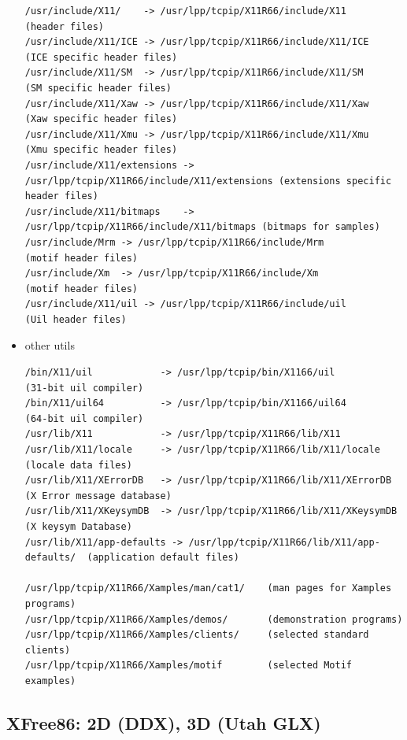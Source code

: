 \begin{itemize}
\begin{verbatim}
/usr/include/X11/    -> /usr/lpp/tcpip/X11R66/include/X11        (header files) 
/usr/include/X11/ICE -> /usr/lpp/tcpip/X11R66/include/X11/ICE    (ICE specific header files) 
/usr/include/X11/SM  -> /usr/lpp/tcpip/X11R66/include/X11/SM     (SM specific header files) 
/usr/include/X11/Xaw -> /usr/lpp/tcpip/X11R66/include/X11/Xaw    (Xaw specific header files) 
/usr/include/X11/Xmu -> /usr/lpp/tcpip/X11R66/include/X11/Xmu    (Xmu specific header files) 
/usr/include/X11/extensions -> /usr/lpp/tcpip/X11R66/include/X11/extensions (extensions specific header files)
/usr/include/X11/bitmaps    -> /usr/lpp/tcpip/X11R66/include/X11/bitmaps (bitmaps for samples) 
/usr/include/Mrm -> /usr/lpp/tcpip/X11R66/include/Mrm            (motif header files) 
/usr/include/Xm  -> /usr/lpp/tcpip/X11R66/include/Xm             (motif header files) 
/usr/include/X11/uil -> /usr/lpp/tcpip/X11R66/include/uil        (Uil header files) 
\end{verbatim}

  \item other utils
  
\begin{verbatim}
/bin/X11/uil            -> /usr/lpp/tcpip/bin/X1166/uil                   (31-bit uil compiler)
/bin/X11/uil64          -> /usr/lpp/tcpip/bin/X1166/uil64                 (64-bit uil compiler)
/usr/lib/X11            -> /usr/lpp/tcpip/X11R66/lib/X11 
/usr/lib/X11/locale     -> /usr/lpp/tcpip/X11R66/lib/X11/locale           (locale data files) 
/usr/lib/X11/XErrorDB   -> /usr/lpp/tcpip/X11R66/lib/X11/XErrorDB         (X Error message database) 
/usr/lib/X11/XKeysymDB  -> /usr/lpp/tcpip/X11R66/lib/X11/XKeysymDB        (X keysym Database) 
/usr/lib/X11/app-defaults -> /usr/lpp/tcpip/X11R66/lib/X11/app-defaults/  (application default files)

/usr/lpp/tcpip/X11R66/Xamples/man/cat1/    (man pages for Xamples programs) 
/usr/lpp/tcpip/X11R66/Xamples/demos/       (demonstration programs) 
/usr/lpp/tcpip/X11R66/Xamples/clients/     (selected standard clients) 
/usr/lpp/tcpip/X11R66/Xamples/motif        (selected Motif examples)
\end{verbatim}
\end{itemize}


\subsection{XFree86: 2D (DDX), 3D (Utah GLX)}
\label{sec:XFree86}
\label{sec:DDX}
\label{sec:UtahGLX}

